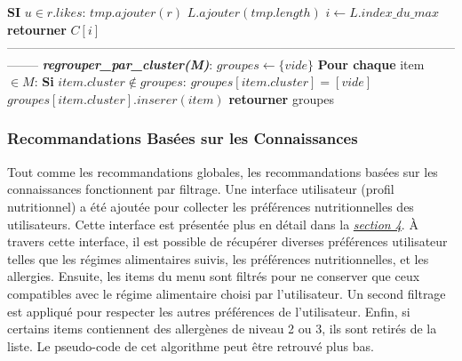 \documentclass[11pt]{article}
\begin{document}
\begin{algorithm}
\begin{algorithmic}[1]
        \State \hspace{2cm} \textbf{SI} $u \in r.likes$:
        \State \hspace{2.5cm} $tmp.ajouter(r)$
        \State \hspace{1cm} $L.ajouter(tmp.length)$
        \State \hspace{0.5cm} $i \leftarrow L.index\_du\_max$
        \State \hspace{0.5cm} \textbf{retourner} $C[i]$
        \\
--------------------------------------------------------------------------------------------------------------------
		\State \textbf{\textit{regrouper\_par\_cluster(M)}}:
		\State \hspace{0.5cm} $groupes \leftarrow \{vide\}$
		\State \hspace{0.5cm} \textbf{Pour chaque} item $\in M$:
		\State \hspace{1cm} \textbf{Si} $item.cluster \notin groupes$:
		\State \hspace{1.5cm} $groupes[item.cluster] = [vide]$
		\State \hspace{1cm} $groupes[item.cluster].inserer(item)$
		\State \hspace{0.5cm} \textbf{retourner} groupes 
		
    \end{algorithmic}
\end{algorithm}

\subsubsection{Recommandations Basées sur les Connaissances}
Tout comme les recommandations globales, les recommandations basées sur les connaissances fonctionnent par filtrage. Une interface utilisateur (profil nutritionnel) a été ajoutée pour collecter les préférences nutritionnelles des utilisateurs. Cette interface est présentée plus en détail dans la \hyperref[implementation]{\textit{section 4}}. À travers cette interface, il est possible de récupérer diverses préférences utilisateur telles que les régimes alimentaires suivis, les préférences nutritionnelles, et les allergies. Ensuite, les items du menu sont filtrés pour ne conserver que ceux compatibles avec le régime alimentaire choisi par l'utilisateur. Un second filtrage est appliqué pour respecter les autres préférences de l'utilisateur. Enfin, si certains items contiennent des allergènes de niveau 2 ou 3, ils sont retirés de la liste. Le pseudo-code de cet algorithme peut être retrouvé plus bas.
\end{document}
